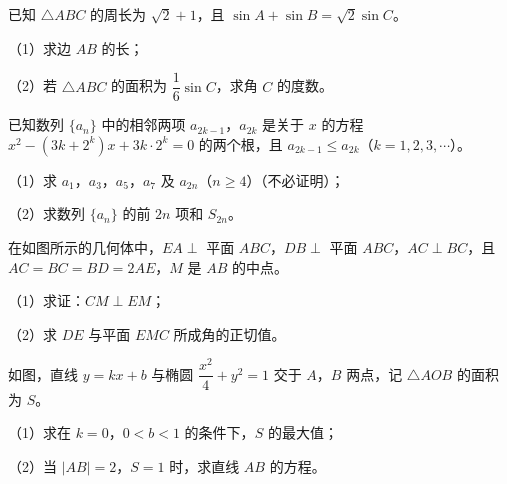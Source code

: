 \begin{question}
已知 $\triangle ABC$ 的周长为 $\sqrt2+1$，且 $\sin A+\sin B=\sqrt2\sin C$。

（1）求边 $AB$ 的长；

（2）若 $\triangle ABC$ 的面积为 $\dfrac16\sin C$，求角 $C$ 的度数。

\end{question}
\begin{question}
已知数列 $\{a_n\}$ 中的相邻两项 $a_{2k-1}$，$a_{2k}$ 是关于 $x$ 的方程 $x^2-(3k+2^k)x+3k\cdot2^k=0$ 的两个根，且 $a_{2k-1}\leqslant a_{2k}$（$k=1,2,3,\cdots$）。

（1）求 $a_1$，$a_3$，$a_5$，$a_7$ 及 $a_{2n}$（$n\geqslant4$）（不必证明）；

（2）求数列 $\{a_n\}$ 的前 $2n$ 项和 $S_{2n}$。

\Needspace{0.4\textheight}
\end{question}
\begin{question}
在如图所示的几何体中，$EA\perp$ 平面 $ABC$，$DB\perp$ 平面 $ABC$，$AC\perp BC$，且 $AC=BC=BD=2AE$，$M$ 是 $AB$ 的中点。

（1）求证：$CM\perp EM$；

（2）求 $DE$ 与平面 $EMC$ 所成角的正切值。
\nopagebreak[4]
\begin{center}\end{center}
\nopagebreak[4]
\Needspace{0.4\textheight}
\end{question}
\begin{question}
如图，直线 $y=kx+b$ 与椭圆 $\dfrac{x^2}{4}+y^2=1$ 交于 $A$，$B$ 两点，记 $\triangle AOB$ 的面积为 $S$。

（1）求在 $k=0$，$0<b<1$ 的条件下，$S$ 的最大值；

（2）当 $|AB|=2$，$S=1$ 时，求直线 $AB$ 的方程。
\nopagebreak[4]
\begin{center}\end{center}
\nopagebreak[4]

\end{question}